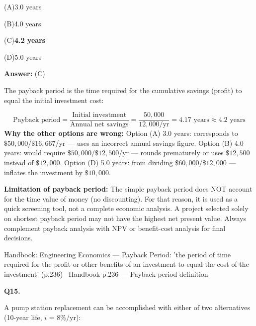 \documentclass[11pt]{article}
\newcommand{\correct}[1]{\textbf{#1}\;{\color{accent}$\checkmark$}}
\newcommand{\optline}[2]{\par\noindent\hspace{1.2em}(#1)\hspace{0.6em}#2}
\begin{document}
\optline{A}{3.0 years}
\optline{B}{4.0 years}
\optline{C}{\correct{4.2 years}}
\optline{D}{5.0 years}
\par\vspace{3pt}
\vspace{2pt}\par\noindent\colorbox{boxbg}{\parbox{\dimexpr\linewidth-2\fboxsep\relax}{%
\vspace{2pt}\textbf{Answer:} (C)\par\vspace{2pt}
{\small The payback period is the time required for the cumulative savings (profit) to equal the initial investment cost:\par
\[\text{Payback period} = \frac{\text{Initial investment}}{\text{Annual net savings}} = \frac{50{,}000}{12{,}000/\text{yr}} = 4.17 \text{ years} \approx 4.2 \text{ years}\]
\textbf{Why the other options are wrong:} Option (A) 3.0 years: corresponds to $\$50{,}000$/$\$16{,}667$/yr --- uses an incorrect annual savings figure. Option (B) 4.0 years: would require $\$50{,}000$/$\$12{,}500$/yr --- rounds prematurely or uses $\$12{,}500$ instead of $\$12{,}000$. Option (D) 5.0 years: from dividing $\$60{,}000$/$\$12{,}000$ --- inflates the investment by $\$10{,}000$.\par
\textbf{Limitation of payback period:} The simple payback period does NOT account for the time value of money (no discounting). For that reason, it is used as a quick screening tool, not a complete economic analysis. A project selected solely on shortest payback period may not have the highest net present value. Always complement payback analysis with NPV or benefit-cost analysis for final decisions.\par}\par\vspace{2pt}
{\footnotesize\color{soft}Handbook: Engineering Economics --- Payback Period: 'the period of time required for the profit or other benefits of an investment to equal the cost of the investment' (p.236) \textbullet\ Handbook p.236 --- Payback period definition}\vspace{2pt}
}}
\vspace{9pt}
\filbreak
\textbf{\color{accent}Q15.}\par\vspace{2pt}
A pump station replacement can be accomplished with either of two alternatives (10-year life, $i$ = 8\%/yr):\par
\end{document}
